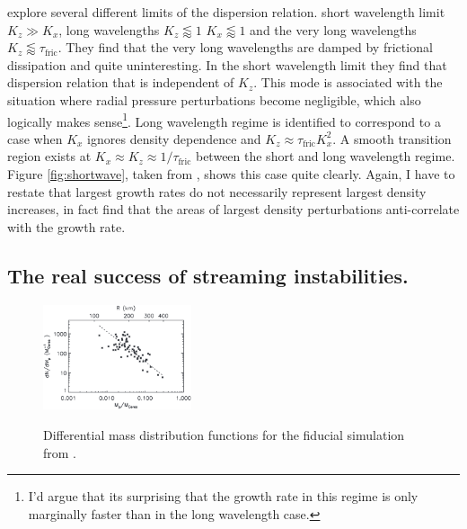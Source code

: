 \documentclass[12pt]{article}
\begin{document}
\cite{Youdin05} explore several different limits of the dispersion relation. short wavelength limit $K_z\gg K_x$, long wavelengths $K_z\lessapprox1$ $K_x\lessapprox1$ and the very long wavelengths $K_z\lessapprox\tau_\mathrm{fric}$. They find that the very long wavelengths are damped by frictional dissipation and quite uninteresting. In the short wavelength limit they find that dispersion relation that is independent of $K_z$. This mode is associated with the situation where radial pressure perturbations become negligible, which also logically makes sense\footnote{I'd argue that its surprising that the growth rate in this regime is only marginally faster than in the long wavelength case.}. Long wavelength regime is identified to correspond to a case when $K_x$ ignores density dependence and $K_z\approx\tau_\mathrm{fric}K_x^2$. A smooth transition region exists at $K_x\approx K_z\approx 1/ \tau_\mathrm{fric}$ between the short and long wavelength regime. Figure \ref{fig:shortwave}, taken from \cite{Youdin05}, shows this case quite clearly. Again, I have to restate that largest growth rates do not necessarily represent largest density increases, in fact \cite{Youdin05} find that the areas of largest density perturbations anti-correlate with the growth rate. 

\subsection{The real success of streaming instabilities.}
\begin{figure}
  \begin{center}
    \label{fig:massradius}
    \includegraphics[width=0.39\textwidth]{images/diffmass.png}
  \end{center}
  \caption{Differential mass distribution functions for the fiducial simulation from \cite{Simon16}.}
\end{figure}
\end{document}

